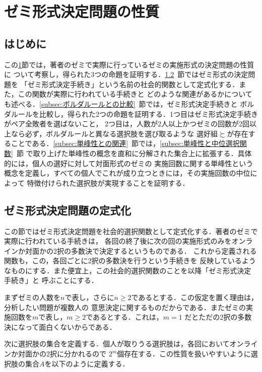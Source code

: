 \documentclass[dvipdfmx]{jsarticle}
\begin{document}
\section{ゼミ形式決定問題の性質}\label{sec:ゼミ形式決定問題の性質}
\subsection{はじめに}
この\ref{sec:ゼミ形式決定問題の性質}節では，著者のゼミで実際に行っているゼミの実施形式の決定問題の性質に
ついて考察し，得られた3つの命題を証明する．\ref{subsec:ゼミ形式決定問題の定式化}~節ではゼミ形式の決定問題を
「ゼミ形式決定手続き」という名前の社会的関数として定式化する．また，この関数が実際に行われている手続きと
どのような関連があるかについても述べる．\ref{subsec:ボルダルールとの比較}~節では，ゼミ形式決定手続きと
ボルダルールを比較し，得られた2つの命題を証明する．1つ目はゼミ形式決定手続きがペア全敗者を選ばないこと，
2つ目は，人数が2人以上かつゼミの回数が2回以上なら必ず，ボルダルールと異なる選択肢を選び取るような
選好組$\succsim$が存在することである．\ref{subsec:単峰性との関連}~節では，\ref{subsec:単峰性と中位選択関数}~節
で取り上げた単峰性の概念を直和に分解された集合上に拡張する．具体的には，個人の選好に対して対面形式のゼミの
実施回数に関する単峰性という概念を定義し，すべての個人でこれが成り立つときには，その実施回数の中位によって
特徴付けられた選択肢が実現することを証明する．


\subsection{ゼミ形式決定問題の定式化}\label{subsec:ゼミ形式決定問題の定式化}
この節ではゼミ形式決定問題を社会的選択関数として定式化する．著者のゼミで実際に行われている手続きは，
各回の終了後に次の回の実施形式のみをオンラインか対面かの2択の多数決で決定するというものである．
これから定義される関数も，この，各回ごとに2択の多数決を行うという手続きを
反映しているようなものにする．また便宜上，この社会的選択関数のことを以降「ゼミ形式決定手続き」と
呼ぶことにする．

まずゼミの人数を$n$で表し，さらに$n \geq 2$であるとする．この仮定を置く理由は，分析したい問題が複数人の
意思決定に関するものだからである．またゼミの実施回数を$m$で表し，$m \geq 2$であるとする．これは，$m=1$
だとただの2択の多数決になって面白くないからである．

次に選択肢の集合を定義する．個人が取りうる選択肢は，各回においてオンラインか対面かの2択に分かれるので
$2^m$個存在する．この性質を扱いやすいように選択肢の集合$A$を以下のように定義する．
\end{document}
